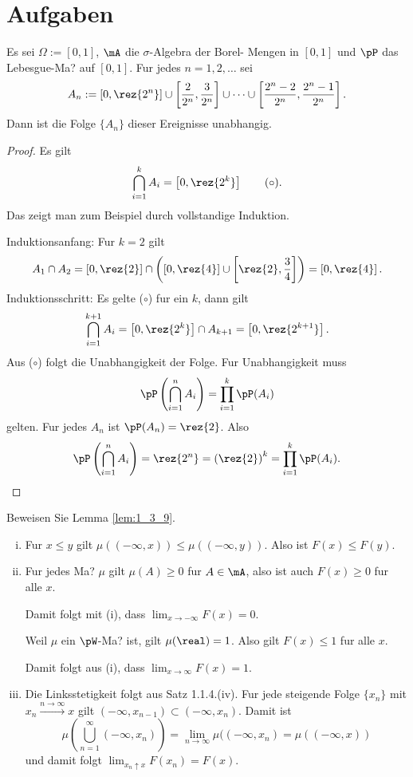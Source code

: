 \section{Aufgaben}
\begin{aufg}
  Es sei $\Omega := [0, 1]$, $\mA$ die $\sigma$-Algebra der Borel-
  Mengen in $[0, 1]$ und $\pP$ das Lebesgue-Ma? auf $[0, 1]$. Fur jedes $n = 1, 2,
  \ldots$ sei
  \[ A_n := \left[ 0, \rez{2^n} \right] \cup
    \left[  \frac{2}{2^n}, \frac{3}{2^n} \right]
    \cup \cdots \cup
    \left[ \frac{2^n-2}{2^n}, \frac{2^n-1}{2^n} \right]. \]
  Dann ist die Folge $\{A_n\}$ dieser Ereignisse unabhangig.
\end{aufg}

\begin{proof}
  Es gilt
  \[ \bigcap_{i=1}^k A_i = \left[ 0,\rez{2^k} \right] \tag{$\circ$}. \]
  Das zeigt man zum Beispiel durch vollstandige Induktion.

  Induktionsanfang:  Fur $k=2$ gilt
  \[ A_1 \cap A_2 = \left[ 0, \rez{2} \right] \cap \left( \left[ 0, \rez{4}
      \right] \cup \left[ \rez{2}, \frac{3}{4} \right] \right) = \left[
      0,\rez{4} \right]. \]
  Induktionsschritt: Es gelte ($\circ$) fur ein $k$, dann gilt
  \[ \bigcap_{i=1}^{k+1} A_i = \left[ 0,\rez{2^k} \right] \cap A_{k+1} =  \left[
      0,\rez{2^{k+1}} \right]. \]
  Aus ($\circ$) folgt die Unabhangigkeit der Folge. Fur Unabhangigkeit muss
  \[ \pP \left( \bigcap_{i=1}^n A_i \right) = \prod_{i=1}^k \pP(A_i) \]
  gelten. Fur jedes $A_n$ ist $\pP(A_n) = \rez{2}$. Also
  \[ \pP \left( \bigcap_{i=1}^n A_i \right) = \rez{2^n} = \left( \rez{2}
    \right)^k = \prod_{i=1}^k \pP(A_i). \qedhere \]
\end{proof}

\begin{aufg}
 Beweisen Sie Lemma \ref{lem:1_3_9}.
\end{aufg}

\begin{enumerate}[(i)]
\item Fur $x \le y$ gilt $\mu((-\infty,x)) \le \mu((-\infty,y))$. Also ist $F(x)
  \le F(y)$.
\item Fur jedes Ma? $\mu$ gilt $\mu(A) \ge 0$ fur $A \in \mA$, also ist auch
  $F(x) \ge 0$ fur alle $x$.

  Damit folgt mit (i), dass $\lim_{x \to -\infty} F(x) = 0$.

  Weil $\mu$ ein $\pW$-Ma? ist, gilt $\mu(\real) = 1$. Also gilt $F(x) \le 1$
  fur alle $x$.

  Damit folgt aus (i), dass $\lim_{x \to \infty} F(x) = 1$.
\item Die Linksstetigkeit folgt aus Satz 1.1.4.(iv). Fur jede steigende Folge $\{ x_n \}$
  mit $x_n \xrightarrow{n \to \infty} x$ gilt $(-\infty, x_{n-1}) \subset
  (-\infty, x_n)$. Damit ist
  \[ \mu \left( \bigcup_{n=1}^\infty (-\infty, x_n) \right) = \lim_{n \to
      \infty} \mu( (-\infty, x_n)  = \mu( (-\infty, x) ) \]
  und damit folgt $\lim_{x_n \uparrow x} F(x_n) = F(x)$.
\end{enumerate}

